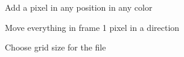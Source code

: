\documentclass[11pt]{article} %
\begin{document}
{\begin{figure}[H]
	\centering
	\caption{Add a pixel in any position in any color}
	\label{fig:UC5}
\end{figure}

\begin{figure}[H]
	\centering
	\caption{Move everything in frame 1 pixel in a direction}
	\label{fig:UC6}
\end{figure}

\begin{figure}[H]
	\centering
	\caption{Choose grid size for the file}
	\label{fig:UC7}
\end{figure}

}
\end{document}
